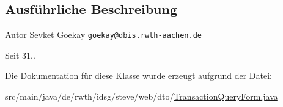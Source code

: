 \subsection{Ausführliche Beschreibung}
\begin{DoxyAuthor}{Autor}
Sevket Goekay \href{mailto:goekay@dbis.rwth-aachen.de}{\tt goekay@dbis.\+rwth-\/aachen.\+de} 
\end{DoxyAuthor}
\begin{DoxySince}{Seit}
31.. 
\end{DoxySince}


Die Dokumentation für diese Klasse wurde erzeugt aufgrund der Datei\+:\begin{DoxyCompactItemize}
\item 
src/main/java/de/rwth/idsg/steve/web/dto/\hyperlink{_transaction_query_form_8java}{Transaction\+Query\+Form.\+java}\end{DoxyCompactItemize}

